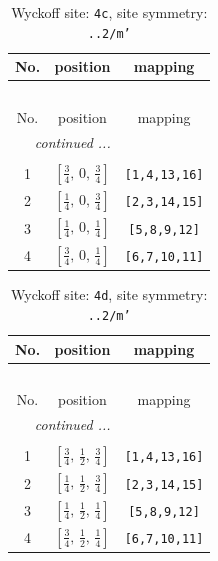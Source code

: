 \documentclass[fleqn,8pt]{jsarticle}
\begin{document}
\renewcommand{\arraystretch}{1.2}
\begin{longtable}{ccc}
\caption{Wyckoff site: {\tt 4c}, site symmetry: {\tt ..2/m'}}
 \\
 \hline \hline
No. & position & mapping \\ \hline \endfirsthead

\multicolumn{2}{l}{\tablename\ \thetable{}} \\
 \hline \hline
No. & position & mapping \\ \hline \endhead

 \hline \hline
\multicolumn{2}{r}{\footnotesize\it continued ...} \\ \endfoot

 \hline \hline
\multicolumn{2}{r}{} \\ \endlastfoot

1 & $\left[ \frac{3}{4},\, 0,\, \frac{3}{4} \right]$ & {\tt [1,4,13,16]} \\ \hline
2 & $\left[ \frac{1}{4},\, 0,\, \frac{3}{4} \right]$ & {\tt [2,3,14,15]} \\ \hline
3 & $\left[ \frac{1}{4},\, 0,\, \frac{1}{4} \right]$ & {\tt [5,8,9,12]} \\ \hline
4 & $\left[ \frac{3}{4},\, 0,\, \frac{1}{4} \right]$ & {\tt [6,7,10,11]} \\
\end{longtable}
\renewcommand{\arraystretch}{1.2}
\begin{longtable}{ccc}
\caption{Wyckoff site: {\tt 4d}, site symmetry: {\tt ..2/m'}}
 \\
 \hline \hline
No. & position & mapping \\ \hline \endfirsthead

\multicolumn{2}{l}{\tablename\ \thetable{}} \\
 \hline \hline
No. & position & mapping \\ \hline \endhead

 \hline \hline
\multicolumn{2}{r}{\footnotesize\it continued ...} \\ \endfoot

 \hline \hline
\multicolumn{2}{r}{} \\ \endlastfoot

1 & $\left[ \frac{3}{4},\, \frac{1}{2},\, \frac{3}{4} \right]$ & {\tt [1,4,13,16]} \\ \hline
2 & $\left[ \frac{1}{4},\, \frac{1}{2},\, \frac{3}{4} \right]$ & {\tt [2,3,14,15]} \\ \hline
3 & $\left[ \frac{1}{4},\, \frac{1}{2},\, \frac{1}{4} \right]$ & {\tt [5,8,9,12]} \\ \hline
4 & $\left[ \frac{3}{4},\, \frac{1}{2},\, \frac{1}{4} \right]$ & {\tt [6,7,10,11]} \\
\end{longtable}
\end{document}
